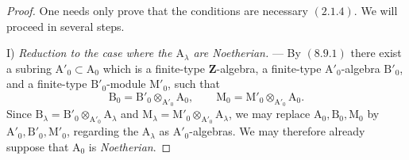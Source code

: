 \begin{proof}
One needs only prove that the conditions are necessary $(2.1.4)$. We will proceed in several steps.

\medskip
\noindent I) \emph{Reduction to the case where the
$\mathrm{A}_\lambda$ are Noetherian.} --- By $(8.9.1)$ there exist a
subring $\mathrm{A}'_0\subset\mathrm{A}_0$ which is a finite-type
$\mathbf{Z}$-algebra, a finite-type $\mathrm{A}'_0$-algebra
$\mathrm{B}'_0$, and a finite-type $\mathrm{B}'_0$-module
$\mathrm{M}'_0$, such that
\[
  \mathrm{B}_0=\mathrm{B}'_0\otimes_{\mathrm{A}'_0}\mathrm{A}_0,
  \qquad
  \mathrm{M}_0=\mathrm{M}'_0\otimes_{\mathrm{A}'_0}\mathrm{A}_0.
\]
Since
$\mathrm{B}_\lambda=\mathrm{B}'_0\otimes_{\mathrm{A}'_0}
\mathrm{A}_\lambda$ and
$\mathrm{M}_\lambda=\mathrm{M}'_0\otimes_{\mathrm{A}'_0}
\mathrm{A}_\lambda$, we may replace
$\mathrm{A}_0,\mathrm{B}_0,\mathrm{M}_0$ by
$\mathrm{A}'_0,\mathrm{B}'_0,\mathrm{M}'_0$, regarding the
$\mathrm{A}_\lambda$ as $\mathrm{A}'_0$-algebras. We may therefore
already suppose that $\mathrm{A}_0$ is \emph{Noetherian}.


\end{proof}
